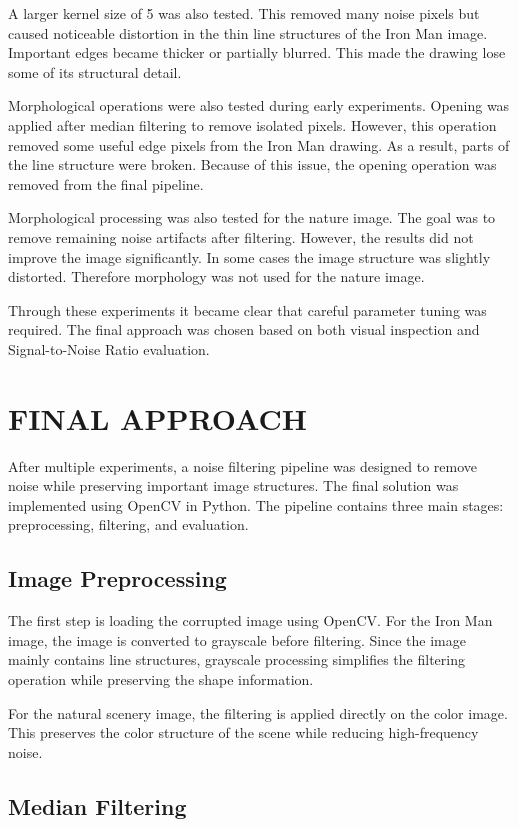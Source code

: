 \documentclass[letterpaper, 10 pt, conference]{ieeeconf}
\begin{document}
A larger kernel size of 5 was also tested. This removed many noise pixels but caused noticeable distortion in the thin line structures of the Iron Man image. 
Important edges became thicker or partially blurred. This made the drawing lose some of its structural detail.

Morphological operations were also tested during early experiments. Opening was applied after median filtering to remove isolated pixels. 
However, this operation removed some useful edge pixels from the Iron Man drawing. As a result, parts of the line structure were broken. 
Because of this issue, the opening operation was removed from the final pipeline.

Morphological processing was also tested for the nature image. The goal was to remove remaining noise artifacts after filtering. 
However, the results did not improve the image significantly. In some cases the image structure was slightly distorted. 
Therefore morphology was not used for the nature image.

Through these experiments it became clear that careful parameter tuning was required. 
The final approach was chosen based on both visual inspection and Signal-to-Noise Ratio evaluation.


\section{FINAL APPROACH}

After multiple experiments, a noise filtering pipeline was designed to remove noise while preserving important image structures. 
The final solution was implemented using OpenCV in Python. The pipeline contains three main stages: preprocessing, filtering, and evaluation.

\subsection{Image Preprocessing}

The first step is loading the corrupted image using OpenCV. For the Iron Man image, the image is converted to grayscale before filtering. 
Since the image mainly contains line structures, grayscale processing simplifies the filtering operation while preserving the shape information.

For the natural scenery image, the filtering is applied directly on the color image. This preserves the color structure of the scene while reducing high-frequency noise.

\subsection{Median Filtering}
\end{document}
